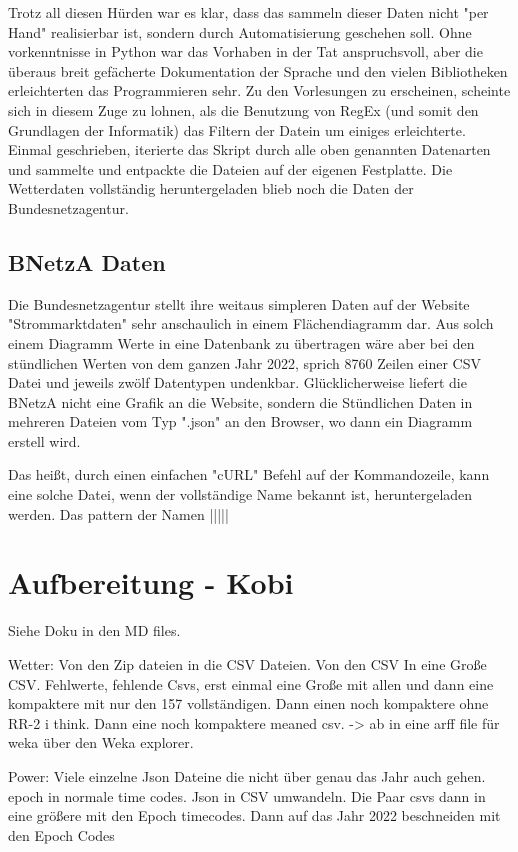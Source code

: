 \documentclass[letterpaper]{article} %
\begin{document}
        Trotz all diesen Hürden war es klar, dass das sammeln dieser Daten nicht "per Hand" realisierbar ist, sondern durch Automatisierung geschehen soll. Ohne vorkenntnisse in Python war das Vorhaben in der Tat anspruchsvoll, aber die überaus breit gefächerte Dokumentation der Sprache und den vielen Bibliotheken erleichterten das Programmieren sehr.
        Zu den Vorlesungen zu erscheinen, scheinte sich in diesem Zuge zu lohnen, als die Benutzung von RegEx (und somit den Grundlagen der Informatik) das Filtern der Datein um einiges erleichterte. Einmal geschrieben, iterierte das Skript durch alle oben genannten Datenarten und sammelte und entpackte die Dateien auf der eigenen Festplatte. 
        Die Wetterdaten vollständig heruntergeladen blieb noch die Daten der Bundesnetzagentur.

    \subsection*{BNetzA Daten}
        Die Bundesnetzagentur stellt ihre weitaus simpleren Daten auf der Website "Strommarktdaten" sehr anschaulich in einem Flächendiagramm dar. Aus solch einem Diagramm Werte in eine Datenbank zu übertragen wäre aber bei den stündlichen Werten von dem ganzen Jahr 2022, sprich 8760 Zeilen einer CSV Datei und jeweils zwölf Datentypen undenkbar. Glücklicherweise liefert die BNetzA nicht eine Grafik an die Website, sondern die Stündlichen Daten in mehreren Dateien vom Typ ".json" an den Browser, wo dann ein Diagramm erstell wird.

        Das heißt, durch einen einfachen "cURL" Befehl auf der Kommandozeile, kann eine solche Datei, wenn der vollständige Name bekannt ist, heruntergeladen werden. Das pattern der Namen |||||



\section*{Aufbereitung - Kobi}
    Siehe Doku in den MD files.
    
    Wetter: Von den Zip dateien in die CSV Dateien. Von den CSV In eine Große CSV. Fehlwerte, fehlende Csvs, erst einmal eine Große mit allen und dann eine kompaktere mit nur den 157 vollständigen. Dann einen  noch kompaktere ohne RR-2 i think. Dann eine noch kompaktere meaned csv. -> ab in eine arff file für weka über den Weka explorer.

    Power: Viele einzelne Json Dateine die nicht über genau das Jahr auch gehen. epoch in normale time codes. Json in CSV umwandeln. Die Paar csvs dann in eine größere mit den Epoch timecodes. Dann auf das Jahr 2022 beschneiden mit den Epoch Codes
\end{document}
